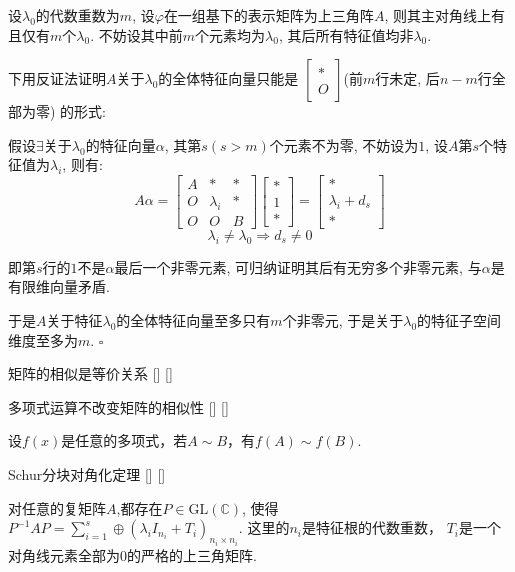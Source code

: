 \documentclass[UTF8]{ctexart}
\begin{document}
		\begin{prf}
			设$\lambda_0$的代数重数为$m$, 设$\varphi$在一组基下的表示矩阵为上三角阵$A$, 则其主对角线上有且仅有$m$个$\lambda_0$. 不妨设其中前$m$个元素均为$\lambda_0$, 其后所有特征值均非$\lambda_0$. 

			下用反证法证明$A$关于$\lambda_0$的全体特征向量只能是
			$\begin{bmatrix}
				* \\ O
			\end{bmatrix}$(前$m$行未定, 后$n-m$行全部为零)
			的形式: 

			假设$\exists$关于$\lambda_0$的特征向量$\alpha$, 其第$s(s>m)$个元素不为零, 不妨设为$1$, 设$A$第$s$个特征值为$\lambda_i$, 则有: 
			\[A\alpha=
			\begin{bmatrix}
				A & * & * \\
				O & \lambda_i & * \\
				O & O & B
			\end{bmatrix}
			\begin{bmatrix}
				* \\ 1 \\ *
			\end{bmatrix}=
			\begin{bmatrix}
				* \\ \lambda_i+d_s \\ *
			\end{bmatrix}\]
			\[\lambda_i\neq\lambda_0\Longrightarrow d_s\neq 0\]
			
			即第$s$行的$1$不是$\alpha$最后一个非零元素, 可归纳证明其后有无穷多个非零元素, 与$\alpha$是有限维向量矛盾. 

			于是$A$关于特征$\lambda_0$的全体特征向量至多只有$m$个非零元, 于是关于$\lambda_0$的特征子空间维度至多为$m$. $\square$
		
		\end{prf} 

		\begin{ppt}
			[]
			{矩阵的相似是等价关系}
			[]
			[]
		\end{ppt}

		\begin{ppt}
			[]
			{多项式运算不改变矩阵的相似性}
			[]
			[]

			设$f(x)$是任意的多项式，若$A\sim B$，有$f(A)\sim f(B)$.
		\end{ppt}

		\begin{thm}
			[]
			{Schur分块对角化定理}
			[]
			[]

			对任意的复矩阵$A$,都存在$P\in\text{GL}(\mathbb{C})$, 使得 $P^{-1}AP=\sum_{i=1}^{s}\oplus (\lambda_iI_{n_i}+T_i)_{n_i\times n_i}$. 这里的$n_i$是特征根的代数重数， $T_i$是一个对角线元素全部为0的严格的上三角矩阵.
		\end{thm}
\end{document}
